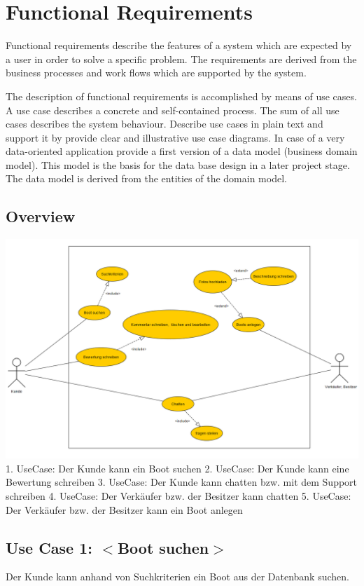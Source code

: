 \documentclass[12pt]{article}
\theoremstyle{definition}
\newenvironment{explanation}{%
   \setlength{\parindent}{0pt}
   \itshape
   \color{blue}
}{}
\begin{document}
\section{Functional Requirements}
\begin{explanation}
Functional requirements describe the features of a system which are expected by a user in order to solve a specific problem. The requirements are derived from the business processes and work flows which are supported by the system.

The description of functional requirements is accomplished by means of use cases. A use case describes a concrete and self-contained process. The sum of all use cases describes the system behaviour. Describe use cases in plain text and support it by provide clear and illustrative use case diagrams.
In case of a very data-oriented application provide a first version of a data model (business domain model). This model is the basis for the data base design in a later project stage. The data model is derived from the entities of the domain model.
\end{explanation}

\subsection{Overview}
\begin{explanation}
	\includegraphics[height=0.50\textwidth]{UseCaseDiagram.PNG}
	1. UseCase: Der Kunde kann ein Boot suchen
	2. UseCase: Der Kunde kann eine Bewertung schreiben
	3. UseCase: Der Kunde kann chatten bzw. mit dem Support schreiben
	4. UseCase: Der Verkäufer bzw. der Besitzer kann chatten
	5. UseCase: Der Verkäufer bzw. der Besitzer kann ein Boot anlegen 
\end{explanation}

\subsection{Use Case 1: $<$Boot suchen$>$}
\begin{explanation}
Der Kunde kann anhand von Suchkriterien ein Boot aus der Datenbank suchen.
\end{explanation}
\end{document}
